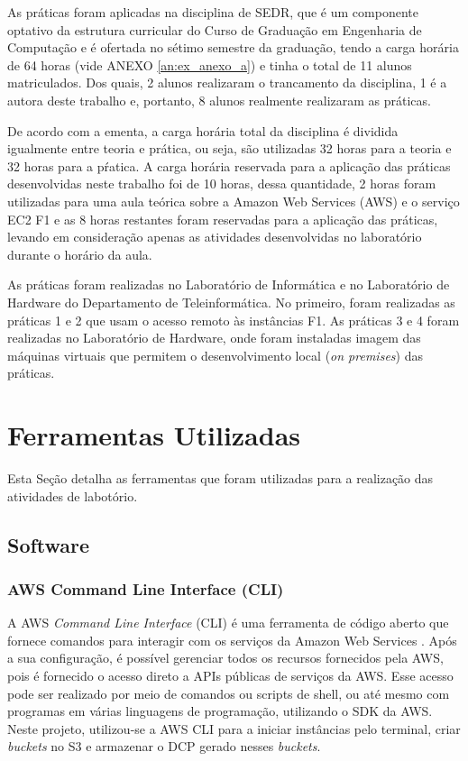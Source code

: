 As práticas foram aplicadas na disciplina de SEDR, que é um componente optativo da estrutura curricular do Curso de Graduação em Engenharia de Computação e é ofertada no sétimo semestre da graduação, tendo a carga horária de 64 horas (vide ANEXO \ref{an:ex_anexo_a}) e tinha o total de 11 alunos matriculados. Dos quais, 2 alunos realizaram o trancamento da disciplina, 1 é a autora deste trabalho e, portanto, 8 alunos realmente realizaram as práticas. 

De acordo com a ementa, a carga horária total da disciplina é dividida igualmente entre teoria e prática, ou seja, são utilizadas 32 horas para a teoria e 32 horas para a pŕatica. A carga horária reservada para a  aplicação das práticas desenvolvidas neste trabalho foi de 10 horas, dessa quantidade, 2 horas foram utilizadas para uma aula teórica sobre a Amazon Web Services (AWS) e o serviço EC2 F1 e as 8 horas restantes foram reservadas para a aplicação das práticas, levando em consideração apenas as atividades desenvolvidas no laboratório durante o horário da aula.

As práticas foram realizadas no Laboratório de Informática e no Laboratório de Hardware do Departamento de Teleinformática. No primeiro, foram realizadas as práticas 1 e 2 que usam o acesso remoto às instâncias F1. As práticas 3 e 4 foram realizadas no Laboratório de Hardware, onde foram instaladas imagem das máquinas virtuais que permitem  o desenvolvimento local (\textit{on premises}) das práticas.

\section{Ferramentas Utilizadas}\label{sec: ferramentas}

Esta Seção detalha as ferramentas que foram utilizadas para a realização das atividades de labotório.

\subsection{Software}\label{sec: software}

\subsubsection{AWS Command Line Interface (CLI)}\label{sec: aws-cli}

A AWS \textit{Command Line Interface} (CLI) é uma ferramenta de código aberto que fornece comandos para interagir com os serviços da Amazon Web Services \cite{awscli}. Após a sua configuração, é possível gerenciar todos os recursos fornecidos pela AWS, pois é fornecido o acesso direto a APIs públicas de serviços da AWS. Esse acesso pode ser realizado por meio de comandos ou scripts de shell, ou até mesmo com programas em várias linguagens de programação, utilizando o SDK da AWS. Neste projeto, utilizou-se a AWS CLI para a iniciar instâncias pelo terminal, criar \textit{buckets} no S3 e armazenar o DCP gerado nesses \textit{buckets}.   

